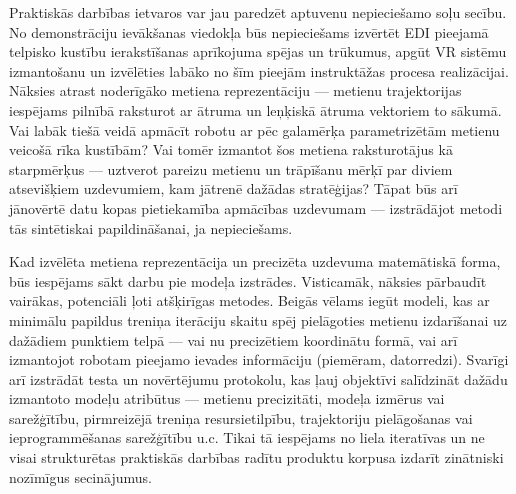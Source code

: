 \documentclass[12pt, a4paper]{article}
\numberwithin{equation}{section} %
\begin{document}
Praktiskās darbības ietvaros var jau paredzēt aptuvenu nepieciešamo soļu secību. No demonstrāciju ievākšanas viedokļa būs nepieciešams izvērtēt EDI pieejamā telpisko kustību ierakstīšanas aprīkojuma spējas un trūkumus, apgūt VR sistēmu izmantošanu un izvēlēties labāko no šīm pieejām instruktāžas procesa realizācijai. Nāksies atrast noderīgāko metiena reprezentāciju --- metienu trajektorijas iespējams pilnībā raksturot ar ātruma un leņķiskā ātruma vektoriem to sākumā. Vai labāk tiešā veidā apmācīt robotu ar pēc galamērķa parametrizētām metienu veicošā rīka kustībām? Vai tomēr izmantot šos metiena raksturotājus kā starpmērķus --- uztverot pareizu metienu un trāpīšanu mērķī par diviem atsevišķiem uzdevumiem, kam jātrenē dažādas stratēģijas? Tāpat būs arī jānovērtē datu kopas pietiekamība apmācības uzdevumam --- izstrādājot metodi tās sintētiskai papildināšanai, ja nepieciešams.

Kad izvēlēta metiena reprezentācija un precizēta uzdevuma matemātiskā forma, būs iespējams sākt darbu pie modeļa izstrādes. Visticamāk, nāksies pārbaudīt vairākas, potenciāli ļoti atšķirīgas metodes. Beigās vēlams iegūt modeli, kas ar minimālu papildus treniņa iterāciju skaitu spēj pielāgoties metienu izdarīšanai uz dažādiem punktiem telpā --- vai nu precizētiem koordinātu formā, vai arī izmantojot robotam pieejamo ievades informāciju (piemēram, datorredzi). Svarīgi arī izstrādāt testa un novērtējumu protokolu, kas ļauj objektīvi salīdzināt dažādu izmantoto modeļu atribūtus --- metienu precizitāti, modeļa izmērus vai sarežģītību, pirmreizējā treniņa resursietilpību, trajektoriju pielāgošanas vai ieprogrammēšanas sarežģītību u.c. Tikai tā iespējams no liela iteratīvas un ne visai strukturētas praktiskās darbības radītu produktu korpusa izdarīt zinātniski nozīmīgus secinājumus.

\newpage
{}
\printbibliography[title=Atsauces]
\end{document}
